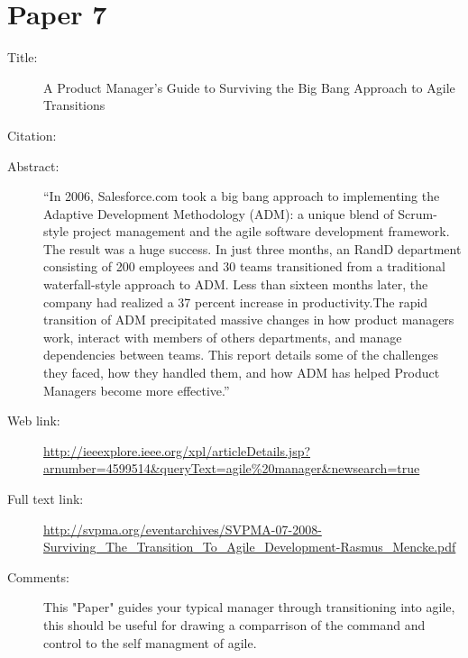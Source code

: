 \documentclass{scrartcl}
\begin{document}
\section*{Paper 7}
\begin{description}
	\item[Title:] A Product Manager's Guide to Surviving the Big Bang Approach to Agile Transitions 
	\item[Citation:] \cite{ManagerGuide}
	\item[Abstract:] ``In 2006, Salesforce.com took a big bang approach to implementing the Adaptive Development Methodology (ADM): a unique blend of Scrum-style project management and the agile software development framework. The result was a huge success. In just three months, an RandD department consisting of 200 employees and 30 teams transitioned from a traditional waterfall-style approach to ADM. Less than sixteen months later, the company had realized a 37 percent increase in productivity.The rapid transition of ADM precipitated massive changes in how product managers work, interact with members of others departments, and manage dependencies between teams. This report details some of the challenges they faced, how they handled them, and how ADM has helped Product Managers become more effective.''
	\item[Web link:] \url{http://ieeexplore.ieee.org/xpl/articleDetails.jsp?arnumber=4599514&queryText=agile%20manager&newsearch=true}
	\item[Full text link:] \url{http://svpma.org/eventarchives/SVPMA-07-2008-Surviving_The_Transition_To_Agile_Development-Rasmus_Mencke.pdf}
	\item[Comments:] This "Paper" guides your typical manager through transitioning into agile, this should be useful for drawing a comparrison of the command and control to the self managment of agile.
\end{description}
\end{document}
